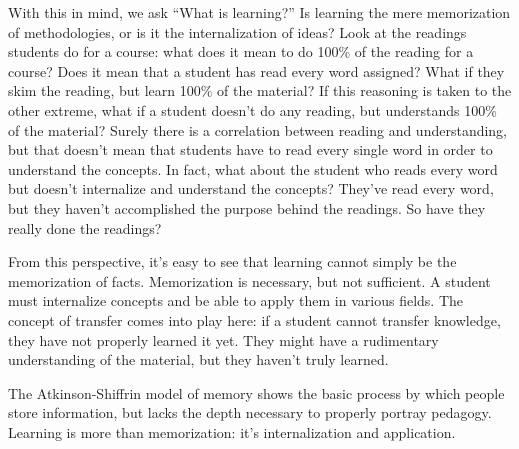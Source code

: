 \documentclass[12pt]{article}
\begin{document}
With this in mind, we ask ``What is learning?'' Is learning the mere memorization of methodologies, or is it the internalization of ideas? Look at the readings students do for a course: what does it mean to do 100\% of the reading for a course? Does it mean that a student has read every word assigned? What if they skim the reading, but learn 100\% of the material? If this reasoning is taken to the other extreme, what if a student doesn't do any reading, but understands 100\% of the material? Surely there is a correlation between reading and understanding, but that doesn't mean that students have to read every single word in order to understand the concepts. In fact, what about the student who reads every word but doesn't internalize and understand the concepts? They've read every word, but they haven't accomplished the purpose behind the readings. So have they really done the readings?

From this perspective, it's easy to see that learning cannot simply be the memorization of facts. Memorization is necessary, but not sufficient. A student must internalize concepts and be able to apply them in various fields. The concept of transfer comes into play here: if a student cannot transfer knowledge, they have not properly learned it yet. They might have a rudimentary understanding of the material, but they haven't truly learned.

The Atkinson-Shiffrin model of memory shows the basic process by which people store information, but lacks the depth necessary to properly portray pedagogy. Learning is more than memorization: it's internalization and application.
\end{document}
